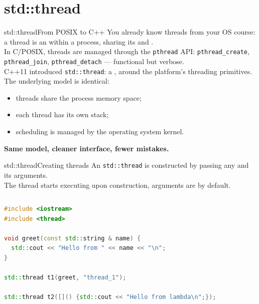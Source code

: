 
\section{std::thread}
\graphicspath{{figs/section2/}}

\begin{frame}{std::thread}{From POSIX to C++}
	\justifying
	You already know threads from your OS course: a thread is an  within a process, sharing its  and .\\
	\bigskip
	In C/POSIX, threads are managed through the \texttt{pthread} API: \texttt{pthread\_create}, \texttt{pthread\_join}, \texttt{pthread\_detach} — functional but verbose.\\
	\bigskip
	C++11 introduced \texttt{std::thread}: a ,  around the platform's threading primitives.\\
	The underlying model is identical:
	\begin{itemize}
		\item threads share the process memory space;
		\item each thread has its own stack;
		\item scheduling is managed by the operating system kernel.
	\end{itemize}
	\begin{block}{}
		\centering
		\textbf{Same model, cleaner interface, fewer mistakes.}
	\end{block}
\end{frame}
\begin{frame}[fragile]{std::thread}{Creating threads}
	\justifying
	An \texttt{std::thread} is constructed by passing any  and its arguments.\\
	The thread starts executing  upon construction, arguments are  by default.
	\begin{columns}
		\begin{lstlisting}[style=codebeamer, language=C++, caption=Creating threads from a function and a lambda.]
#include <iostream>
#include <thread>

void greet(const std::string & name) {
  std::cout << "Hello from " << name << "\n";
}

std::thread t1(greet, "thread_1");

std::thread t2([]() {std::cout << "Hello from lambda\n";});
    \end{lstlisting}
	\end{columns}
\end{frame}
